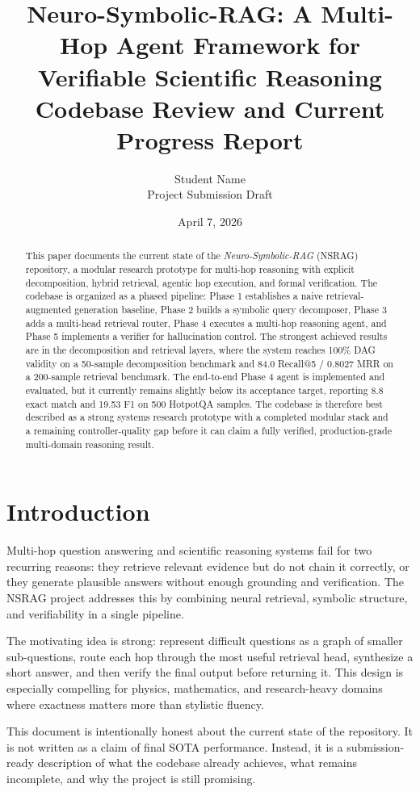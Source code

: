 \documentclass[11pt]{article}
\title{\textbf{Neuro-Symbolic-RAG: A Multi-Hop Agent Framework for Verifiable Scientific Reasoning}\\
\large Codebase Review and Current Progress Report}
\author{Student Name \\ Project Submission Draft}
\date{April 7, 2026}
\begin{document}
\maketitle

\begin{abstract}
This paper documents the current state of the \textit{Neuro-Symbolic-RAG} (NSRAG) repository, a modular research prototype for multi-hop reasoning with explicit decomposition, hybrid retrieval, agentic hop execution, and formal verification. The codebase is organized as a phased pipeline: Phase 1 establishes a naive retrieval-augmented generation baseline, Phase 2 builds a symbolic query decomposer, Phase 3 adds a multi-head retrieval router, Phase 4 executes a multi-hop reasoning agent, and Phase 5 implements a verifier for hallucination control. The strongest achieved results are in the decomposition and retrieval layers, where the system reaches 100\% DAG validity on a 50-sample decomposition benchmark and 84.0 Recall@5 / 0.8027 MRR on a 200-sample retrieval benchmark. The end-to-end Phase 4 agent is implemented and evaluated, but it currently remains slightly below its acceptance target, reporting 8.8 exact match and 19.53 F1 on 500 HotpotQA samples. The codebase is therefore best described as a strong systems research prototype with a completed modular stack and a remaining controller-quality gap before it can claim a fully verified, production-grade multi-domain reasoning result.
\end{abstract}

\section{Introduction}
Multi-hop question answering and scientific reasoning systems fail for two recurring reasons: they retrieve relevant evidence but do not chain it correctly, or they generate plausible answers without enough grounding and verification. The NSRAG project addresses this by combining neural retrieval, symbolic structure, and verifiability in a single pipeline.

The motivating idea is strong: represent difficult questions as a graph of smaller sub-questions, route each hop through the most useful retrieval head, synthesize a short answer, and then verify the final output before returning it. This design is especially compelling for physics, mathematics, and research-heavy domains where exactness matters more than stylistic fluency.

This document is intentionally honest about the current state of the repository. It is not written as a claim of final SOTA performance. Instead, it is a submission-ready description of what the codebase already achieves, what remains incomplete, and why the project is still promising.
\end{document}
